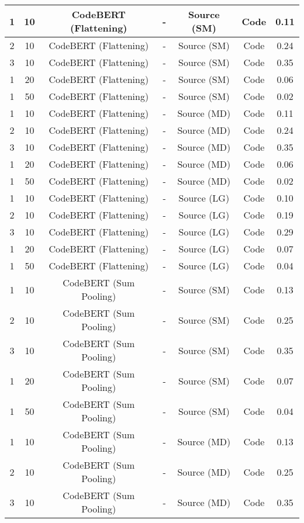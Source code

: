 \begin{longtable}{|c|c|c|c|c|c|c|}
\hline
1 & 10 & CodeBERT (Flattening) & - & Source (SM) & Code & 0.11 \\
\hline
2 & 10 & CodeBERT (Flattening) & - & Source (SM) & Code & 0.24 \\
\hline
3 & 10 & CodeBERT (Flattening) & - & Source (SM) & Code & 0.35 \\
\hline
1 & 20 & CodeBERT (Flattening) & - & Source (SM) & Code & 0.06 \\
\hline
1 & 50 & CodeBERT (Flattening) & - & Source (SM) & Code & 0.02 \\
\hline
1 & 10 & CodeBERT (Flattening) & - & Source (MD) & Code & 0.11 \\
\hline
2 & 10 & CodeBERT (Flattening) & - & Source (MD) & Code & 0.24 \\
\hline
3 & 10 & CodeBERT (Flattening) & - & Source (MD) & Code & 0.35 \\
\hline
1 & 20 & CodeBERT (Flattening) & - & Source (MD) & Code & 0.06 \\
\hline
1 & 50 & CodeBERT (Flattening) & - & Source (MD) & Code & 0.02 \\
\hline
1 & 10 & CodeBERT (Flattening) & - & Source (LG) & Code & 0.10 \\
\hline
2 & 10 & CodeBERT (Flattening) & - & Source (LG) & Code & 0.19 \\
\hline
3 & 10 & CodeBERT (Flattening) & - & Source (LG) & Code & 0.29 \\
\hline
1 & 20 & CodeBERT (Flattening) & - & Source (LG) & Code & 0.07 \\
\hline
1 & 50 & CodeBERT (Flattening) & - & Source (LG) & Code & 0.04 \\
\hline
1 & 10 & CodeBERT (Sum Pooling) & - & Source (SM) & Code & 0.13 \\
\hline
2 & 10 & CodeBERT (Sum Pooling) & - & Source (SM) & Code & 0.25 \\
\hline
3 & 10 & CodeBERT (Sum Pooling) & - & Source (SM) & Code & 0.35 \\
\hline
1 & 20 & CodeBERT (Sum Pooling) & - & Source (SM) & Code & 0.07 \\
\hline
1 & 50 & CodeBERT (Sum Pooling) & - & Source (SM) & Code & 0.04 \\
\hline
1 & 10 & CodeBERT (Sum Pooling) & - & Source (MD) & Code & 0.13 \\
\hline
2 & 10 & CodeBERT (Sum Pooling) & - & Source (MD) & Code & 0.25 \\
\hline
3 & 10 & CodeBERT (Sum Pooling) & - & Source (MD) & Code & 0.35 \\

\end{longtable}
